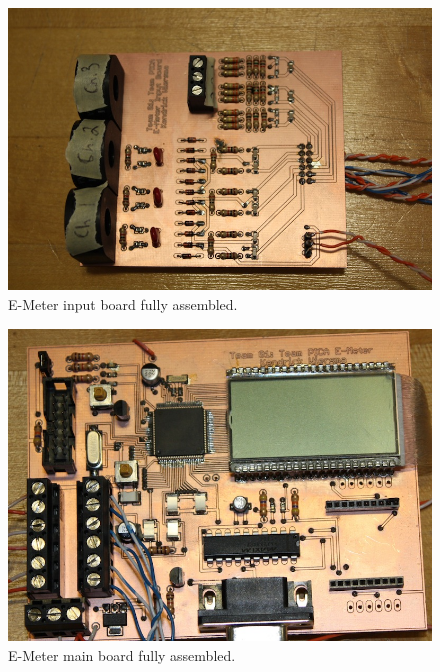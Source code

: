 \begin{figure}[htbp]
  \centering
  \includegraphics[width=5in]{includes/emeterhw/input_board_assembled}
  \caption{E-Meter input board fully assembled.}
  \label{fig:input_board_assembled}
\end{figure}

\begin{figure}[htbp]
  \centering
  \includegraphics[width=5in]{includes/emeterhw/main_board_assembled}
  \caption{E-Meter main board fully assembled.}
  \label{fig:main_board_assembled}
\end{figure}



